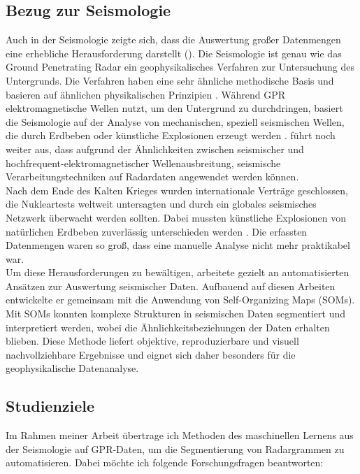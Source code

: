 \subsection{Bezug zur Seismologie}

Auch in der Seismologie zeigte sich, dass die Auswertung großer Datenmengen eine erhebliche Herausforderung darstellt (\cite{dowla_seismic_1990}).
Die Seismologie ist genau wie das Ground Penetrating Radar ein geophysikalisches Verfahren zur Untersuchung des Untergrunds. Die Verfahren haben eine sehr ähnliche methodische Basis und basieren auf ähnlichen physikalischen Prinzipien \parencite{forte_review_2017}. Während GPR elektromagnetische Wellen nutzt, um den Untergrund zu durchdringen, basiert die Seismologie auf der Analyse von mechanischen, speziell seismischen Wellen, die durch Erdbeben oder künstliche Explosionen erzeugt werden \parencite{carcione_acoustic-electromagnetic_1995}. \textcite{forte_review_2017} führt noch weiter aus, dass aufgrund der Ähnlichkeiten zwischen seismischer und hochfrequent-elektromagnetischer Wellenausbreitung, seismische Verarbeitungstechniken auf Radardaten angewendet werden können. \\
Nach dem Ende des Kalten Krieges wurden internationale Verträge geschlossen, die Nukleartests weltweit untersagten und durch ein globales seismisches Netzwerk überwacht werden sollten. Dabei mussten künstliche Explosionen von natürlichen Erdbeben zuverlässig unterschieden werden \parencite{dahlmann_monitoring_1977}. Die erfassten Datenmengen waren so groß, dass eine manuelle Analyse nicht mehr praktikabel war. \\
Um diese Herausforderungen zu bewältigen, arbeitete \textcite{dowla_seismic_1990} gezielt an automatisierten Ansätzen zur Auswertung seismischer Daten. Aufbauend auf diesen Arbeiten entwickelte er gemeinsam mit \textcite{maurer_seismic_1992} die Anwendung von Self-Organizing Maps (SOMs). Mit SOMs konnten komplexe Strukturen in seismischen Daten segmentiert und interpretiert werden, wobei die Ähnlichkeitsbeziehungen der Daten erhalten blieben. Diese Methode liefert objektive, reproduzierbare und visuell nachvollziehbare Ergebnisse und eignet sich daher besonders für die geophysikalische Datenanalyse.

\subsection{Studienziele}

Im Rahmen meiner Arbeit übertrage ich Methoden des maschinellen Lernens aus der Seismologie auf GPR-Daten, um die Segmentierung von Radargrammen zu automatisieren. Dabei möchte ich folgende Forschungsfragen beantworten:


